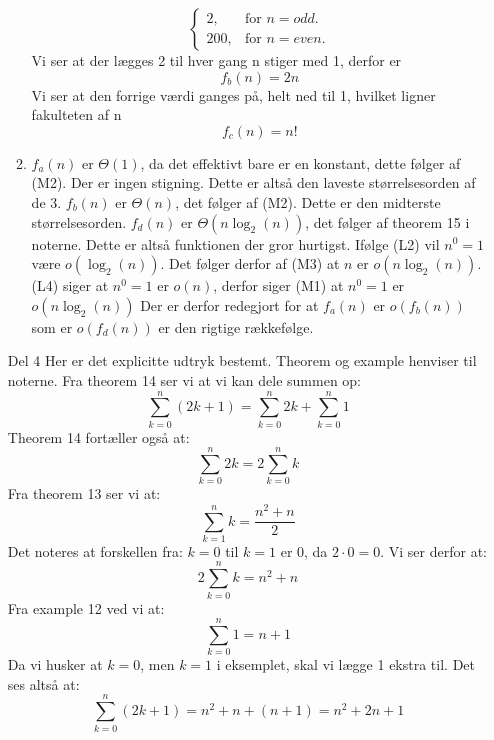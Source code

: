 \documentclass[a4paper]{article}
\begin{document}
\begin{itemize}
\begin{enumerate}[label=(\alph*)]
\begin{equation}
\begin{cases}
                2, & \text{for $n = odd$}.\\
                200, & \text{for $n = even$}.
            \end{cases}
        \end{equation}
         \newline
        Vi ser at der lægges 2 til hver gang n stiger med 1, derfor er $$ f_{b}(n) = 2n$$
         \newline
        Vi ser at den forrige værdi ganges på, helt ned til 1, hvilket ligner fakulteten af n $$ f_{c}(n) = n! $$
        \item $f_{a}(n)$ er $\Theta (1)$, da det effektivt bare er en konstant, dette følger af (M2). Der er ingen stigning. Dette er altså den laveste størrelsesorden af de 3.\newline
        $f_{b}(n)$ er $\Theta (n)$, det følger af (M2). Dette er den midterste størrelsesorden.\newline
        $f_{d}(n)$ er $\Theta (n\log_2(n))$, det følger af theorem 15 i noterne. Dette er altså funktionen der gror hurtigst.\newline
        Ifølge (L2) vil $n^0 = 1$ være $o(\log_2(n))$. Det følger derfor af (M3) at $n$ er $o(n\log_2(n))$.\newline
        (L4) siger at $n^0 = 1$ er $o(n)$, derfor siger (M1) at $n^0 = 1$ er $o(n\log_2(n))$\newline
        Der er derfor redegjort for at $ f_{a}(n)$ er $o(f_{b}(n))$ som er $o(f_{d}(n))$ er den rigtige rækkefølge.
    \end{enumerate}
    \item[Del 4] Her er det explicitte udtryk bestemt. Theorem og example henviser til noterne.\newline
    Fra theorem 14 ser vi at vi kan dele summen op: $$ \sum_{k=0}^{n} (2k + 1) = \sum_{k=0}^{n} 2k + \sum_{k=0}^{n} 1 $$
    Theorem 14 fortæller også at: $$ \sum_{k=0}^{n} 2k = 2\sum_{k=0}^{n} k $$
    Fra theorem 13 ser vi at: $$ \sum_{k=1}^{n} k = \frac{n^2 + n}{2} $$
    Det noteres at forskellen fra: $k=0$ til $k=1$ er $0$, da $2\cdot 0 = 0$. Vi ser derfor at: $$ 2\sum_{k=0}^{n} k = n^2 + n $$
    Fra example 12 ved vi at: $$ \sum_{k=0}^{n} 1 = n + 1 $$
    Da vi husker at $ k=0 $, men $ k=1 $ i eksemplet, skal vi lægge 1 ekstra til.\newline
    Det ses altså at: $$ \sum_{k=0}^{n} (2k+1) = n^2 + n + (n + 1) = n^2 + 2n +1 $$
\end{itemize}
\end{document}

